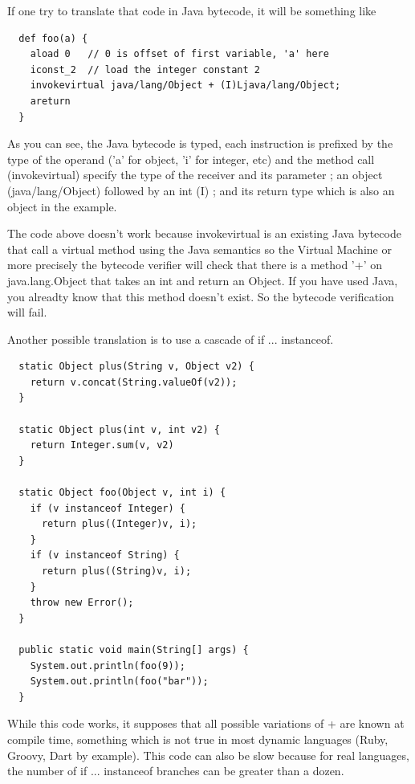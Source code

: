 \documentclass{sigplanconf}
\begin{document}
      If one try to translate that code in Java bytecode, it will be something like
      {\tiny      
      \begin{verbatim}
  def foo(a) {
    aload 0   // 0 is offset of first variable, 'a' here
    iconst_2  // load the integer constant 2
    invokevirtual java/lang/Object + (I)Ljava/lang/Object;
    areturn 
  }
      \end{verbatim}
      }

      As you can see, the Java bytecode is typed, each instruction is prefixed 
      by the type of the operand ('a' for object, 'i' for integer, etc)
      and the method call (invokevirtual) specify the type of the receiver and its parameter ;
      an object (java/lang/Object) followed by an int (I) ; and its return type
      which is also an object in the example.

      The code above doesn't work because invokevirtual is an existing Java bytecode that call
      a virtual method using the Java semantics so the Virtual Machine or more precisely
      the bytecode verifier will check that there is a method '+' on java.lang.Object
      that takes an int and return an Object. If you have used Java, you alreadty know
      that this method doesn't exist. So the bytecode verification will fail. 

      Another possible translation is to use a cascade of if ... instanceof.
      {\tiny      
      \begin{verbatim}
  static Object plus(String v, Object v2) {
    return v.concat(String.valueOf(v2));
  }

  static Object plus(int v, int v2) {
    return Integer.sum(v, v2)
  }

  static Object foo(Object v, int i) {
    if (v instanceof Integer) {
      return plus((Integer)v, i);
    }
    if (v instanceof String) {
      return plus((String)v, i);
    }
    throw new Error();
  }

  public static void main(String[] args) {
    System.out.println(foo(9));
    System.out.println(foo("bar"));
  }
      \end{verbatim}
      }

      While this code works, it supposes that all possible variations of + are known at compile time,
      something which is not true in most dynamic languages (Ruby, Groovy, Dart by example).
      This code can also be slow because for real languages, the number of if ... instanceof branches
      can be greater than a dozen. 
      
\end{document}
